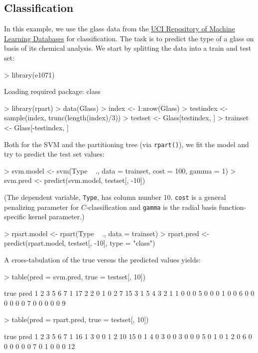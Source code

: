 \documentclass[a4paper]{article}
\begin{document}
\subsection*{Classification}

In this example, we use the glass data from the \href{http://www.ics.uci.edu/mlearn/MLRepository.html}{UCI Repository of
Machine Learning Databases} for
classification. The task is to predict the type of a glass on basis
of its chemical analysis.
We start by splitting the data into a train and test set:
\begin{Schunk}
\begin{Sinput}
> library(e1071)
\end{Sinput}
\begin{Soutput}
Loading required package: class 
\end{Soutput}
\begin{Sinput}
> library(rpart)
> data(Glass)
> index <- 1:nrow(Glass)
> testindex <- sample(index, trunc(length(index)/3))
> testset <- Glass[testindex, ]
> trainset <- Glass[-testindex, ]
\end{Sinput}
\end{Schunk}
Both for the SVM and the partitioning tree (via
\texttt{rpart()}), we fit the model and try to predict the test set
values:
\begin{Schunk}
\begin{Sinput}
> svm.model <- svm(Type ~ ., data = trainset, cost = 100, gamma = 1)
> svm.pred <- predict(svm.model, testset[, -10])
\end{Sinput}
\end{Schunk}
(The dependent variable, \texttt{Type}, has column number
10. \texttt{cost} is a general penalizing parameter for $C$-classification and
\texttt{gamma} is the radial basis function-specific kernel parameter.)
\begin{Schunk}
\begin{Sinput}
> rpart.model <- rpart(Type ~ ., data = trainset)
> rpart.pred <- predict(rpart.model, testset[, -10], type = "class")
\end{Sinput}
\end{Schunk}
A cross-tabulation of the true versus the predicted values yields:
\begin{Schunk}
\begin{Sinput}
> table(pred = svm.pred, true = testset[, 10])
\end{Sinput}
\begin{Soutput}
    true
pred  1  2  3  5  6  7
   1 17  2  2  0  1  0
   2  7 15  3  1  5  4
   3  2  1  1  0  0  0
   5  0  0  0  1  0  0
   6  0  0  0  0  0  0
   7  0  0  0  0  0  9
\end{Soutput}
\begin{Sinput}
> table(pred = rpart.pred, true = testset[, 10])
\end{Sinput}
\begin{Soutput}
    true
pred  1  2  3  5  6  7
   1 16  1  3  0  0  1
   2 10 15  0  1  4  0
   3  0  0  3  0  0  0
   5  0  1  0  1  2  0
   6  0  0  0  0  0  0
   7  0  1  0  0  0 12
\end{Soutput}
\end{Schunk}
\end{document}
